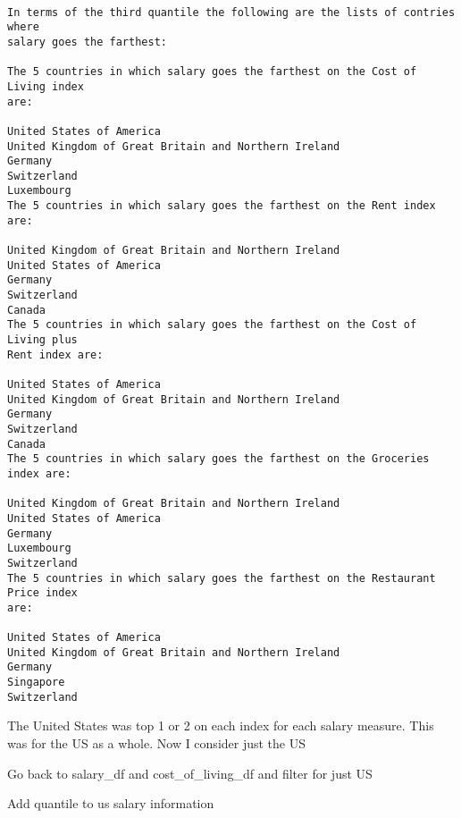 \documentclass[11pt]{article}
\begin{document}
    \begin{center}
    \end{center}
    { \hspace*{\fill} \\}
    
    \begin{Verbatim}[commandchars=\\\{\}]
In terms of the third quantile the following are the lists of contries where
salary goes the farthest:

The 5 countries in which salary goes the farthest on the Cost of Living index
are:

United States of America
United Kingdom of Great Britain and Northern Ireland
Germany
Switzerland
Luxembourg
The 5 countries in which salary goes the farthest on the Rent index are:

United Kingdom of Great Britain and Northern Ireland
United States of America
Germany
Switzerland
Canada
The 5 countries in which salary goes the farthest on the Cost of Living plus
Rent index are:

United States of America
United Kingdom of Great Britain and Northern Ireland
Germany
Switzerland
Canada
The 5 countries in which salary goes the farthest on the Groceries index are:

United Kingdom of Great Britain and Northern Ireland
United States of America
Germany
Luxembourg
Switzerland
The 5 countries in which salary goes the farthest on the Restaurant Price index
are:

United States of America
United Kingdom of Great Britain and Northern Ireland
Germany
Singapore
Switzerland
    \end{Verbatim}

    The United States was top 1 or 2 on each index for each salary measure.
This was for the US as a whole. Now I consider just the US

    Go back to salary\_df and cost\_of\_living\_df and filter for just US

Add quantile to us salary information
\end{document}
